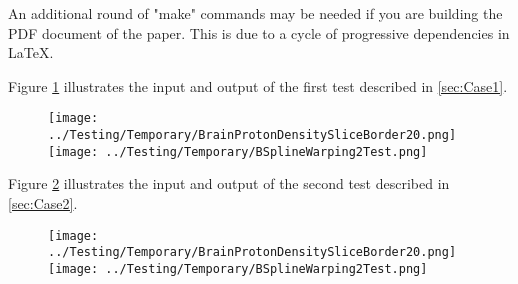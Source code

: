 \documentclass{InsightArticle}
\begin{document}
An additional round of "make" commands may be needed if you are building the
PDF document of the paper. This is due to a cycle of progressive dependencies
in LaTeX.

Figure \ref{fig:Case1} illustrates the input and output of the first test
described in \ref{sec:Case1}.

\begin{figure}
\center
\texttt{[image: ../Testing/Temporary/BrainProtonDensitySliceBorder20.png]}
\texttt{[image: ../Testing/Temporary/BSplineWarping2Test.png]}
\label{fig:Case1}
\end{figure}

Figure \ref{fig:Case2} illustrates the input and output of the second test
described in \ref{sec:Case2}.

\begin{figure}
\center
\texttt{[image: ../Testing/Temporary/BrainProtonDensitySliceBorder20.png]}
\texttt{[image: ../Testing/Temporary/BSplineWarping2Test.png]}
\label{fig:Case2}
\end{figure}
\end{document}
